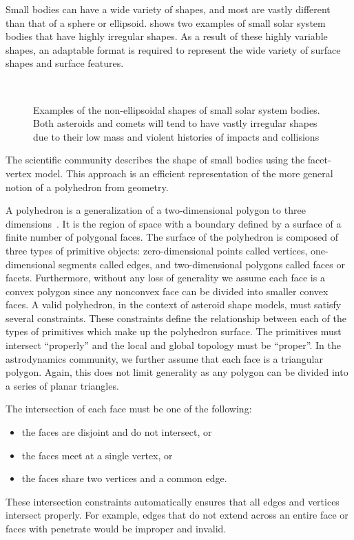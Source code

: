 Small bodies can have a wide variety of shapes, and most are vastly different than that of a sphere or ellipsoid.
 shows two examples of small solar system bodies that have highly irregular shapes.
As a result of these highly variable shapes, an adaptable format is required to represent the wide variety of surface shapes and surface features.
\begin{figure}[h]
    \centering
    ~
    \caption{Examples of the non-ellipsoidal shapes of small solar system bodies. Both asteroids and comets will tend to have vastly irregular shapes due to their low mass and violent histories of impacts and collisions~\label{fig:irregular_asteroids}}
\end{figure}
The scientific community describes the shape of small bodies using the facet-vertex model.
This approach is an efficient representation of the more general notion of a polyhedron from geometry.

A polyhedron is a generalization of a two-dimensional polygon to three dimensions~\cite{orourke1998}.
It is the region of space with a boundary defined by a surface of a finite number of polygonal faces.
The surface of the polyhedron is composed of three types of primitive objects: zero-dimensional points called vertices, one-dimensional segments called edges, and two-dimensional polygons called faces or facets.
Furthermore, without any loss of generality we assume each face is a convex polygon since any nonconvex face can be divided into smaller convex faces.
A valid polyhedron, in the context of asteroid shape models, must satisfy several constraints.
These constraints define the relationship between each of the types of primitives which make up the polyhedron surface.
The primitives must intersect ``properly'' and the local and global topology must be ``proper''.
In the astrodynamics community, we further assume that each face is a triangular polygon.
Again, this does not limit generality as any polygon can be divided into a series of planar triangles.

The intersection of each face must be one of the following:
\begin{itemize}
    \item the faces are disjoint and do not intersect, or
    \item the faces meet at a single vertex, or
    \item the faces share two vertices and a common edge.
\end{itemize}
These intersection constraints automatically ensures that all edges and vertices intersect properly.
For example, edges that do not extend across an entire face or faces with penetrate would be improper and invalid.

